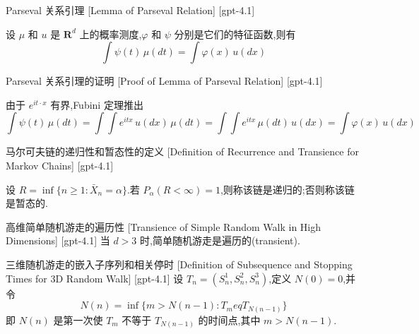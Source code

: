 \documentclass[UTF8]{ctexart}
\begin{document}
    
    
    \begin{lma}
        {Parseval 关系引理}
        [Lemma of Parseval Relation]
        [gpt-4.1]
        
设 $\mu$ 和 $
u$ 是 $\mathbf{R}^d$ 上的概率测度,$\varphi$ 和 $\psi$ 分别是它们的特征函数,则有
\[
\int \psi(t) \, \mu(dt) = \int \varphi(x) \, 
u(dx)
\]

    \end{lma}
    
    
    
    \begin{prf}
        {Parseval 关系引理的证明}
        [Proof of Lemma of Parseval Relation]
        [gpt-4.1]
        
由于 $e^{it \cdot x}$ 有界,Fubini 定理推出
\[
\int \psi(t) \, \mu(dt) = \int \int e^{itx} \, 
u(dx) \, \mu(dt) = \int \int e^{itx} \, \mu(dt) \, 
u(dx) = \int \varphi(x) \, 
u(dx)
\]

    \end{prf}
    
    
    
    \begin{dfn}
        {马尔可夫链的递归性和暂态性的定义}
        [Definition of Recurrence and Transience for Markov Chains]
        [gpt-4.1]
        
设 $R = \operatorname*{inf}\{ n \geq 1 : \bar{X}_n = \alpha \}$.若 $P_\alpha(R < \infty) = 1$,则称该链是递归的;否则称该链是暂态的.

    \end{dfn}
    
    
    
    \begin{thm}
        {高维简单随机游走的遍历性}
        [Transience of Simple Random Walk in High Dimensions]
        [gpt-4.1]
        当 $d > 3$ 时,简单随机游走是遍历的(transient).
    \end{thm}
    
    
    
    \begin{dfn}
        {三维随机游走的嵌入子序列和相关停时}
        [Definition of Subsequence and Stopping Times for 3D Random Walk]
        [gpt-4.1]
        设 $T_{n} = (S_{n}^{1}, S_{n}^{2}, S_{n}^{3})$,定义 $N(0) = 0$,并令
\[N(n) = \inf \{ m > N(n-1) : T_{m} 
eq T_{N(n-1)} \}\]
即 $N(n)$ 是第一次使 $T_{m}$ 不等于 $T_{N(n-1)}$ 的时间点,其中 $m > N(n-1)$.
    \end{dfn}
    
\end{document}
